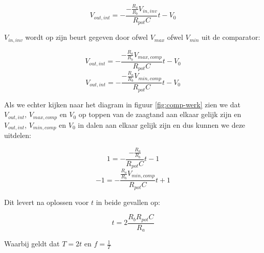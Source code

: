 \documentclass{report}
\begin{document}
$$V_{out,int} = -\frac{-\frac{R_{a}}{R_{b}}V_{in,inv}}{R_{pot}C} t - V_{0}$$

\noindent
$V_{in,inv}$ wordt op zijn beurt gegeven door ofwel $V_{max}$ ofwel $V_{min}$ uit de comparator:

$$V_{out,int} = -\frac{-\frac{R_{a}}{R_{b}}V_{max,comp}}{R_{pot}C} t - V_{0}$$
$$V_{out,int} = -\frac{-\frac{R_{a}}{R_{b}}V_{min,comp}}{R_{pot}C} t - V_{0}$$

\noindent
Als we echter kijken naar het diagram in figuur \ref{fig:comp-werk} zien we dat $V_{out,int}$, $V_{max,comp}$ en $V_{0}$ op toppen van de zaagtand aan elkaar gelijk zijn en $V_{out,int}$, $V_{min,comp}$ en $V_{0}$ in dalen aan elkaar gelijk zijn en dus kunnen we deze uitdelen:

$$1 = -\frac{-\frac{R_{a}}{R_{b}}}{R_{pot}C} t - 1$$
$$-1 = -\frac{\frac{R_{a}}{R_{b}}V_{min,comp}}{R_{pot}C} t + 1$$

\noindent
Dit levert na oplossen voor $t$ in beide gevallen op:

\begin{equation}
	t = 2\frac{R_{b}R_{pot}C}{R_{a}}
\end{equation}

\noindent
Waarbij geldt dat $T=2t$ en $f=\frac{1}{T}$
\end{document}
